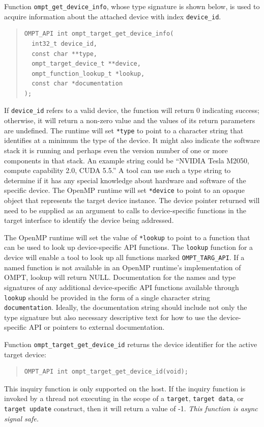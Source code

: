 \documentclass{article}
\begin{document}
Function \verb|ompt_get_device_info|, whose type signature is shown below, is used to acquire information about the attached device with  index \verb|device_id|. 
\begin{quote}
\begin{verbatim}
OMPT_API int ompt_target_get_device_info(
  int32_t device_id, 
  const char **type, 
  ompt_target_device_t **device,
  ompt_function_lookup_t *lookup,
  const char *documentation
);
\end{verbatim}
\end{quote}
If \verb|device_id| refers to a valid device, the function will return 0 indicating success; otherwise, it will return a non-zero value and the values of its return parameters are undefined. The runtime will set \verb|*type| to point to a character string that identifies at a minimum the  type of the device. It might also indicate the software stack it is running and perhaps even the version number of one or more components in that stack. An example string could be ``NVIDIA Tesla M2050, compute capability 2.0, CUDA 5.5.'' A tool can use such a type string to determine if it has any special knowledge about hardware and software of the specific device. The OpenMP runtime will set \verb|*device| to point to an opaque object that represents the target device instance. The device pointer returned will need to be supplied as an argument to calls to device-specific functions in the target interface to identify the device being addressed.

The OpenMP runtime will set the value of \verb|*lookup| to point to a function that can be used to look up device-specific API functions.  The \verb|lookup| function for a device will enable a tool to look up all functions marked \verb|OMPT_TARG_API|.  If a named function is not available in an OpenMP runtime's implementation of OMPT, lookup will return NULL. Documentation for the names and type signatures of any additional device-specific API functions available through \verb|lookup| should be provided in the form of a single character string \verb|documentation|. Ideally, the documentation string should include not only the type signature but also necessary descriptive text for how to use the device-specific API or pointers to external documentation.

Function \verb|ompt_target_get_device_id| returns the device identifier for the active target device:
\begin{quote}
\begin{verbatim}
OMPT_API int ompt_target_get_device_id(void);
\end{verbatim}
\end{quote}
This inquiry function is only supported on the host. If the inquiry function is invoked by a thread not executing in the scope of a {\tt target}, {\tt target data}, or {\tt target update} construct, then it will return a value of -1. {\it This function is async signal safe.}
\end{document}

